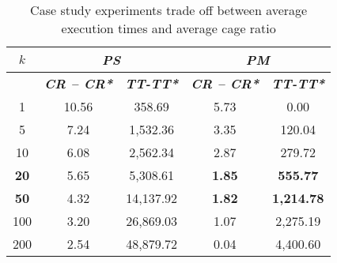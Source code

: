\begin{table}[htbp]
    \caption{Case study experiments trade off between average execution times and average cage ratio}
    \centering
    \begin{tabular}{|c|c|c|c|c|}
    \hline
    \multicolumn{1}{|c|}{\textbf{$k$}} & \multicolumn{ 2}{c|}{\textbf{\textit{PS}}} & \multicolumn{ 2}{c|}{\textbf{\textit{PM}}} \\ \hline
    \multicolumn{1}{|c|}{} & \textbf{\textit{CR – CR*}} & \textbf{\textit{TT-TT*}} & \textbf{\textit{CR – CR*}} & \textbf{\textit{TT-TT*}} \\ \hline
    1 & 10.56 & 358.69 & 5.73 & 0.00 \\
    5 & 7.24 & 1,532.36 & 3.35 & 120.04 \\
    10 & 6.08 & 2,562.34 & 2.87 & 279.72 \\
    \textbf{20} & 5.65 & 5,308.61 & \textbf{1.85} & \textbf{555.77} \\
    \textbf{50} & 4.32 & 14,137.92 & \textbf{1.82} & \textbf{1,214.78} \\
    100 & 3.20 & 26,869.03 & 1.07 & 2,275.19 \\
    200 & 2.54 & 48,879.72 & 0.04 & 4,400.60 \\ \hline
    \end{tabular}
    \label{exp:usecase_tradeoff}
\end{table}
    